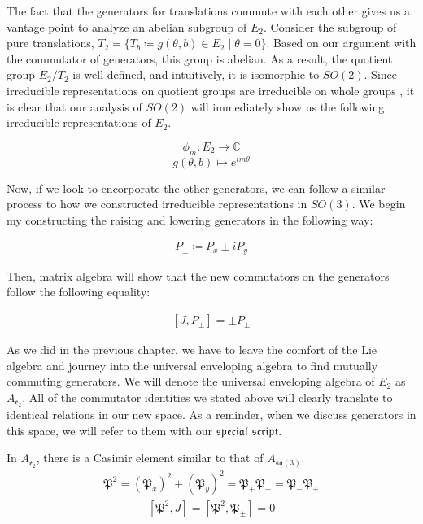 \documentclass[10pt]{ucthesis}
\newcommand{\C}{\mathbb{C}}
\begin{document}
The fact that the generators for translations commute with each other gives us a vantage point to analyze an abelian subgroup of $E_2$. Consider the subgroup of pure translations, $T_2 = \{ T_b \coloneq g(\theta,b)\in E_2 \mid \theta=0\}$. Based on our argument with the commutator of generators, this group is abelian. As a result, the quotient group $E_2/T_2$ is well-defined, and intuitively, it is isomorphic to $SO(2)$. Since irreducible representations on quotient groups are irreducible on whole groups \cite{Mendes}, it is clear that our analysis of $SO(2)$ will immediately show us the following irreducible representations of $E_2$.

$$\phi_m:E_2\rightarrow \C$$
$$g(\theta,b)\mapsto e^{im\theta}$$

Now, if we look to encorporate the other generators, we can follow a similar process to how we constructed irreducible representations in $SO(3)$. We begin my constructing the raising and lowering generators in the following way:

\begin{equation}
\begin{aligned}
	P_\pm \coloneq P_x \pm iP_y
\end{aligned}
\end{equation}

 Then, matrix algebra will show that the new commutators on the generators follow the following equality:

\begin{equation}
\begin{aligned}
	[J,P_\pm] = \pm P_\pm 
\end{aligned}
\end{equation}

As we did in the previous chapter, we have to leave the comfort of the Lie algebra and journey into the universal enveloping algebra to find mutually commuting generators. We will denote the universal enveloping algebra of $E_2$ as $A_{\mathfrak{e_2}}$. All of the commutator identities we stated above will clearly translate to identical relations in our new space. As a reminder, when we discuss generators in this space, we will refer to them with our $\mathfrak{special}$ $\mathfrak{script}$. 

In $A_{\mathfrak{e_2}}$, there is a Casimir element similar to that of $A_{\mathfrak{so}(3)}$. 
\begin{equation}
\begin{aligned}
	\mathfrak{P}^2 = (\mathfrak{P}_x)^2 + (\mathfrak{P}_y)^2 = \mathfrak{P}_+\mathfrak{P}_- = \mathfrak{P}_-\mathfrak{P}_+
\end{aligned}
\end{equation}
\begin{equation}
\begin{aligned}
	[\mathfrak{P}^2,J] =[\mathfrak{P}^2,\mathfrak{P}_\pm]  = 0
\end{aligned}
\end{equation}
\end{document}
